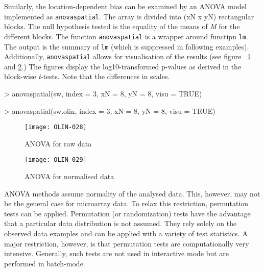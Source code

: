 \documentclass[a4paper,11pt]{article}
\begin{document}
Similarly, the location-dependent bias can be examined by an ANOVA model implemented as
\texttt{anovaspatial}. The array is divided into (xN x yN) rectangular blocks.   
The null hypothesis tested is the equality of the means of \emph{M} for the different blocks.  
The function \texttt{anovaspatial} is a wrapper around functipn \texttt{lm}. The output
is the summary of \texttt{lm} (which is suppressed in following examples).
Additionally,  \texttt{anovaspatial} allows for visualisation of the results (see figure
~\ref{anova} and \ref{anovaolin}.) The figures display the log10-transformed p-values
as derived in the block-wise \textit{t}-tests. Note that the differences in scales.   


\begin{Schunk}
\begin{Sinput}
> anovaspatial(sw, index = 3, xN = 8, yN = 8, visu = TRUE)
\end{Sinput}
\end{Schunk}

\begin{Schunk}
\begin{Sinput}
> anovaspatial(sw.olin, index = 3, xN = 8, yN = 8, visu = TRUE)
\end{Sinput}
\end{Schunk}

\begin{figure}
\centering
\texttt{[image: OLIN-028]}
\caption{ANOVA for raw data}
\label{anova}
\end{figure}

\begin{figure}
\centering
\texttt{[image: OLIN-029]}
\caption{ANOVA for normalised data}
\label{anovaolin}
\end{figure}



ANOVA methods assume normality of the analysed data. This, however, may not be the
general case for microarray data. To relax this restriction, permutation tests can be
applied. Permutation (or randomization) tests have the advantage that a particular data 
distribution is not assumed. They rely solely on the observed data examples and can be 
applied with a variety of test statistics. A major restriction, however, is that 
permutation tests are computationally very intensive.
Generally, such tests are not used in interactive mode but are performed in batch-mode. 
\end{document}
